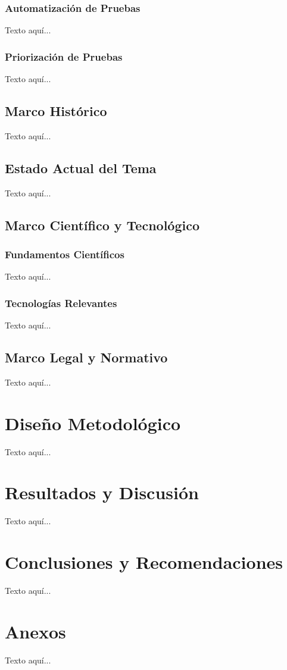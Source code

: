\documentclass[12pt,letterpaper]{article}
\begin{document}
\subsubsection{Automatización de Pruebas}
Texto aquí...

\subsubsection{Priorización de Pruebas}
Texto aquí...

\subsection{Marco Histórico}
Texto aquí...

\subsection{Estado Actual del Tema}
Texto aquí...

\subsection{Marco Científico y Tecnológico}

\subsubsection{Fundamentos Científicos}
Texto aquí...

\subsubsection{Tecnologías Relevantes}
Texto aquí...

\subsection{Marco Legal y Normativo}
Texto aquí... 

\section{Diseño Metodológico}
Texto aquí...

\section{Resultados y Discusión}
Texto aquí...

\section{Conclusiones y Recomendaciones}
Texto aquí...

\printbibliography[title={Bibliografía}]

\section*{Anexos}
Texto aquí...
\end{document}
